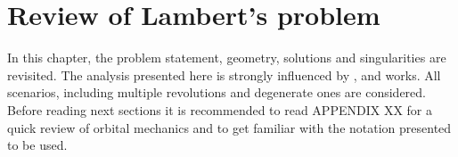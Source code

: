 \chapter{Review of Lambert's problem}

In this chapter, the problem statement, geometry, solutions and singularities
are revisited. The analysis presented here is strongly influenced by
\cite{escobal1970}, \cite{el1968} and \cite{battin1999} works. All scenarios,
including multiple revolutions and degenerate ones are considered. Before
reading next sections it is recommended to read APPENDIX XX for a quick review
of orbital mechanics and to get familiar with the notation presented to be used.






